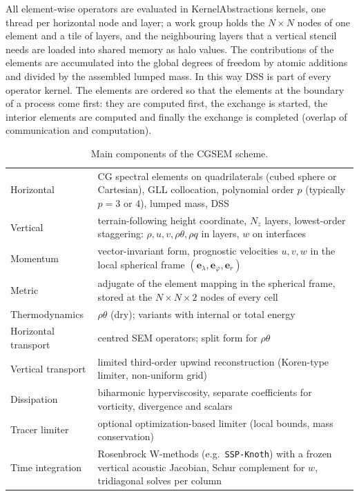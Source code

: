\documentclass[11pt,a4paper]{article}
\newcommand{\code}[1]{\texttt{#1}}
\begin{document}
All element-wise operators are evaluated in KernelAbstractions kernels, one
thread per horizontal node and layer; a work group holds the $N\times N$
nodes of one element and a tile of layers, and the neighbouring layers that
a vertical stencil needs are loaded into shared memory as halo values. The contributions of the elements are
accumulated into the global degrees of freedom by atomic additions and divided
by the assembled lumped mass. In this way DSS is part of every operator
kernel. The elements are ordered so that the elements at the boundary of a
process come first: they are computed first, the exchange is started, the
interior elements are computed and finally the exchange is completed (overlap
of communication and computation).

\begin{table}[h]
\centering
\begin{tabularx}{\textwidth}{lL}
\toprule
Horizontal & CG spectral elements on quadrilaterals (cubed sphere or
  Cartesian), GLL collocation, polynomial order $p$ (typically $p=3$ or $4$),
  lumped mass, DSS\\
Vertical & terrain-following height coordinate, $N_z$ layers, lowest-order
  staggering: $\rho,u,v,\rho\theta,\rho q$ in layers, $w$ on interfaces\\
Momentum & vector-invariant form, prognostic velocities $u,v,w$ in the
  local spherical frame $(\bm e_\lambda,\bm e_\varphi,\bm e_r)$\\
Metric & adjugate of the element mapping in the spherical frame, stored at
  the $N\times N\times 2$ nodes of every cell\\
Thermodynamics & $\rho\theta$ (dry); variants with internal or total energy\\
Horizontal transport & centred SEM operators; split form for $\rho\theta$\\
Vertical transport & limited third-order upwind reconstruction
  (Koren-type limiter, non-uniform grid)\\
Dissipation & biharmonic hyperviscosity, separate coefficients for
  vorticity, divergence and scalars\\
Tracer limiter & optional optimization-based limiter (local bounds,
  mass conservation)\\
Time integration & Rosenbrock W-methods (e.g.\ \code{SSP-Knoth}) with a
  frozen vertical acoustic Jacobian, Schur complement for $w$, tridiagonal
  solves per column\\
\bottomrule
\end{tabularx}
\caption{Main components of the CGSEM scheme.}
\end{table}
\end{document}
